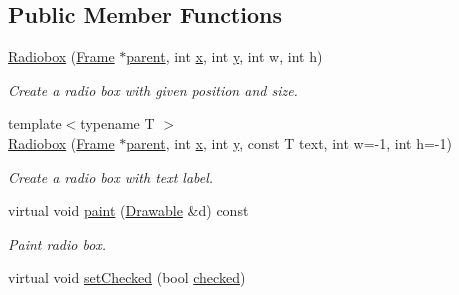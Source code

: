 \subsection*{Public Member Functions}
\begin{DoxyCompactItemize}
\item 
\hypertarget{classGUI_1_1Radiobox_aec6c642cf758d665fc82c4c88ca2924d}{\hyperlink{classGUI_1_1Radiobox_aec6c642cf758d665fc82c4c88ca2924d}{Radiobox} (\hyperlink{classGUI_1_1Frame}{Frame} $\ast$\hyperlink{classGUI_1_1Window_a2e593ff65e7702178d82fe9010a0b539}{parent}, int \hyperlink{classGUI_1_1Window_a6ca6a80ca00c9e1d8ceea8d3d99a657d}{x}, int \hyperlink{classGUI_1_1Window_a0ee8e923aff2c3661fc2e17656d37adf}{y}, int w, int h)}\label{classGUI_1_1Radiobox_aec6c642cf758d665fc82c4c88ca2924d}

\begin{DoxyCompactList}\small\item\em Create a radio box with given position and size. \end{DoxyCompactList}\item 
{\footnotesize template$<$typename T $>$ }\\\hyperlink{classGUI_1_1Radiobox_a88917257a3f3f7f5cc7b89c6646d4c33}{Radiobox} (\hyperlink{classGUI_1_1Frame}{Frame} $\ast$\hyperlink{classGUI_1_1Window_a2e593ff65e7702178d82fe9010a0b539}{parent}, int \hyperlink{classGUI_1_1Window_a6ca6a80ca00c9e1d8ceea8d3d99a657d}{x}, int \hyperlink{classGUI_1_1Window_a0ee8e923aff2c3661fc2e17656d37adf}{y}, const T text, int w=-\/1, int h=-\/1)
\begin{DoxyCompactList}\small\item\em Create a radio box with text label. \end{DoxyCompactList}\item 
\hypertarget{classGUI_1_1Radiobox_a3520cab8e0b2e191d7bb802bd410dada}{virtual void \hyperlink{classGUI_1_1Radiobox_a3520cab8e0b2e191d7bb802bd410dada}{paint} (\hyperlink{classGUI_1_1Drawable}{Drawable} \&d) const }\label{classGUI_1_1Radiobox_a3520cab8e0b2e191d7bb802bd410dada}

\begin{DoxyCompactList}\small\item\em Paint radio box. \end{DoxyCompactList}\item 
\hypertarget{classGUI_1_1Radiobox_a80e0369114c6111f264b54c070d1a280}{virtual void \hyperlink{classGUI_1_1Radiobox_a80e0369114c6111f264b54c070d1a280}{set\-Checked} (bool \hyperlink{classGUI_1_1Radiobox_ace7ecfe96f9746040c020362d13d7046}{checked})}\label{classGUI_1_1Radiobox_a80e0369114c6111f264b54c070d1a280}


\end{DoxyCompactItemize}
